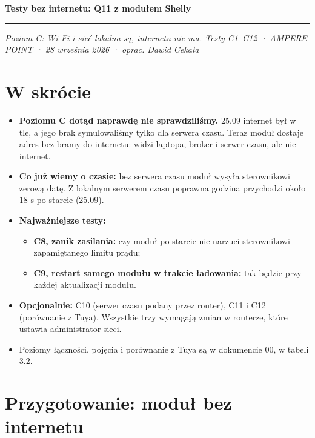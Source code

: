 \documentclass[11pt,a4paper]{article}
\begin{document}
{\LARGE\bfseries Testy bez internetu: Q11 z modułem Shelly\par}
\vspace{4pt}\textcolor{apteal}{\rule{\textwidth}{1.2pt}}
\emph{Poziom C: Wi-Fi i sieć lokalna są, internetu nie ma. Testy C1–C12 · AMPERE POINT · 28 września 2026 · oprac. Dawid Cekała}


\section*{W skrócie}

\begin{itemize}
\item \textbf{Poziomu C dotąd naprawdę nie sprawdziliśmy.} 25.09 internet był w tle, a jego brak symulowaliśmy tylko dla serwera czasu. Teraz moduł dostaje adres bez bramy do internetu: widzi laptopa, broker i serwer czasu, ale nie internet.
\item \textbf{Co już wiemy o czasie:} bez serwera czasu moduł wysyła sterownikowi zerową datę. Z lokalnym serwerem czasu poprawna godzina przychodzi około 18 s po starcie (25.09).
\item \textbf{Najważniejsze testy:}
\begin{itemize}
\item \textbf{C8, zanik zasilania:} czy moduł po starcie nie narzuci sterownikowi zapamiętanego limitu prądu;
\item \textbf{C9, restart samego modułu w trakcie ładowania:} tak będzie przy każdej aktualizacji modułu.
\end{itemize}
\item \textbf{Opcjonalnie:} C10 (serwer czasu podany przez router), C11 i C12 (porównanie z Tuya). Wszystkie trzy wymagają zmian w routerze, które ustawia administrator sieci.
\item Poziomy łączności, pojęcia i porównanie z Tuya są w dokumencie 00, w tabeli 3.2.
\end{itemize}

\section{Przygotowanie: moduł bez internetu}
\end{document}
